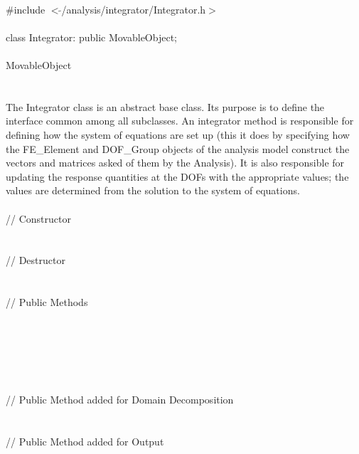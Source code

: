 
   \\
\indent \#include $<\tilde{ }$/analysis/integrator/Integrator.h$>$  \\

  \\
\indent class Integrator: public MovableObject;  \\

 \\
\indent MovableObject \\
\indent{} \\

 \\ 
\indent The Integrator class is an abstract base class. Its purpose is
to define the interface common among all subclasses. An integrator
method is responsible for defining how the system of equations are set
up (this it does by specifying how the FE\_Element and DOF\_Group
objects of the analysis model construct the vectors and matrices asked
of them by the Analysis). It is also responsible for updating the
response quantities at the DOFs with the appropriate values; the values
are determined from the solution to the system of equations. \\

 \\
\indent\indent // Constructor \\
\indent{}\\ \\
\indent\indent // Destructor \\
\indent{}\\  \\
\indent\indent // Public Methods \\
\indent{} \\
\indent{} \\
\indent{} \\
\indent{} \\
\indent{} \\ \\
\indent\indent // Public Method added for Domain Decomposition \\
\indent{} \\ \\
\indent\indent // Public Method added for Output \\
\indent{}\\

